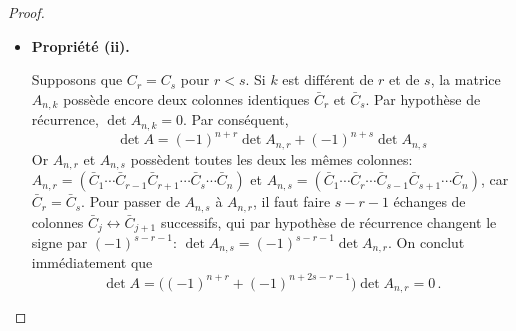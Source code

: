 \documentclass[class=report,crop=false]{standalone}
\begin{document}
\begin{proof}
\begin{itemize}

	\item \textbf{Propriété (ii).}

Supposons que $C_r = C_s$ pour
$r<s$. Si $k$ est différent de $r$ et de $s$,
la matrice $A_{n,k}$ possède encore deux colonnes identiques $\bar{C}_r$ et $\bar{C}_s$.
Par hypothèse de récurrence, $\det A_{n,k}=0$. Par conséquent,
\[
\det A = (-1)^{n+r} \det A_{n,r} + (-1)^{n+s} \det A_{n,s}
\]
Or $A_{n,r}$ et $A_{n,s}$ possèdent toutes les deux les mêmes colonnes:
$A_{n,r} = (\bar{C}_1 \cdots \bar{C}_{r-1} \bar{C}_{r+1} \cdots \bar{C}_{s} \cdots \bar{C}_n)$
et
$A_{n,s} = (\bar{C}_1 \cdots \bar{C}_r \cdots \bar{C}_{s-1}  \bar{C}_{s+1} \cdots \bar{C}_n)$,
car $\bar{C}_r = \bar{C}_s$. Pour passer de $A_{n,s}$ à $A_{n,r}$, il faut faire $s-r-1$ échanges
de colonnes $\bar{C}_j \leftrightarrow \bar{C}_{j+1}$ successifs, qui par hypothèse de récurrence
 changent le signe par $(-1)^{s-r-1}$: $\det A_{n,s} = (-1)^{s-r-1} \det A_{n,r}$.
On conclut immédiatement que
\[
\det A = \big((-1)^{n+r} + (-1)^{n+2 s-r-1}\big) \det A_{n,r} = 0 \, .
\]




\end{itemize}
\end{proof}
\end{document}
